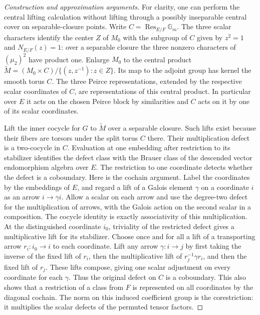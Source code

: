 \documentclass[11pt,a4paper,openany,oneside]{book}
\theoremstyle{resultstyle}
\theoremstyle{definition}
\numberwithin{equation}{chapter}
\begin{document}
\begin{proof}[Construction and approximation arguments]
For clarity, one can perform the central lifting calculation
without lifting through a possibly inseparable central cover
on separable-closure points. Write \(C=\operatorname{Res}_{E/F}
\mathbb G_m\). The three scalar characters identify the center
\(Z\) of \(M_0\) with the subgroup of \(C\) given by \(z^2=1\)
and \(N_{E/F}(z)=1\): over a separable closure the three nonzero
characters of \((\mu_2)^2\) have product one. Enlarge \(M_0\)
to the central product \(\widetilde M=(M_0\times C)/
\{(z,z^{-1}):z\in Z\}\). Its map to the adjoint group has kernel
the smooth torus \(C\). The three Peirce representations, extended
by the respective scalar coordinates of \(C\), are representations
of this central product. In particular over \(E\) it acts on the
chosen Peirce block by similarities and \(C\) acts on it by one of
its scalar coordinates.

Lift the inner cocycle for \(G\) to \(\widetilde M\) over a
separable closure. Such lifts exist because their fibers are
torsors under the split torus \(C\) there. Their multiplication
defect is a two-cocycle in \(C\). Evaluation at one embedding
after restriction to its stabilizer identifies the defect class
with the Brauer class of the descended vector endomorphism
algebra over \(E\). The restriction to one coordinate detects whether the defect
is a coboundary. Here is the cochain argument. Label the coordinates
by the embeddings of \(E\), and regard a lift of a Galois element
\(\gamma\) on a coordinate \(i\) as an arrow \(i\to\gamma i\).
Allow a scalar on each arrow and use the degree-two defect for the
multiplication of arrows, with the Galois action on the second
scalar in a composition. The cocycle identity is exactly
associativity of this multiplication. At the distinguished
coordinate \(i_0\), triviality of the restricted defect gives a
multiplicative lift for its stabilizer. Choose once and for all a
lift of a transporting arrow \(r_i:i_0\to i\) to each coordinate.
Lift any arrow \(\gamma:i\to j\) by first taking the inverse of the
fixed lift of \(r_i\), then the multiplicative lift of
\(r_j^{-1}\gamma r_i\), and then the fixed lift of \(r_j\).
These lifts compose, giving one scalar adjustment on every
coordinate for each \(\gamma\). Thus the original defect on \(C\)
is a coboundary. This also shows that a restriction of a class from
\(F\) is represented on all coordinates by the diagonal cochain.
The norm on this induced coefficient group is the corestriction:
it multiplies the scalar defects of the permuted tensor factors.


\end{proof}
\end{document}
